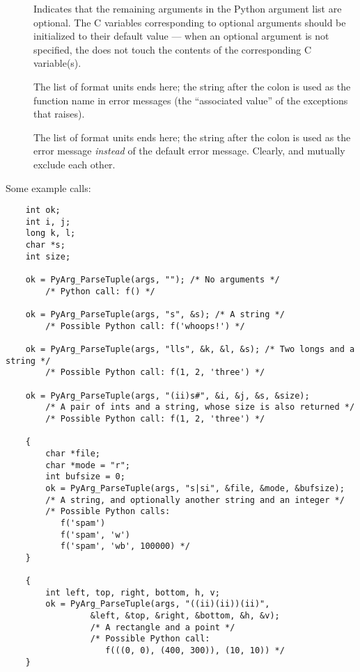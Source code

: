 \begin{description}

\item[\samp{|}]
Indicates that the remaining arguments in the Python argument list are
optional.  The C variables corresponding to optional arguments should
be initialized to their default value --- when an optional argument is
not specified, the  does not touch the contents
of the corresponding C variable(s).

\item[\samp{:}]
The list of format units ends here; the string after the colon is used
as the function name in error messages (the ``associated value'' of
the exceptions that  raises).

\item[\samp{;}]
The list of format units ends here; the string after the colon is used
as the error message \emph{instead} of the default error message.
Clearly, \samp{:} and \samp{;} mutually exclude each other.

\end{description}

Some example calls:

\begin{verbatim}
    int ok;
    int i, j;
    long k, l;
    char *s;
    int size;

    ok = PyArg_ParseTuple(args, ""); /* No arguments */
        /* Python call: f() */
    
    ok = PyArg_ParseTuple(args, "s", &s); /* A string */
        /* Possible Python call: f('whoops!') */

    ok = PyArg_ParseTuple(args, "lls", &k, &l, &s); /* Two longs and a string */
        /* Possible Python call: f(1, 2, 'three') */
    
    ok = PyArg_ParseTuple(args, "(ii)s#", &i, &j, &s, &size);
        /* A pair of ints and a string, whose size is also returned */
        /* Possible Python call: f(1, 2, 'three') */

    {
        char *file;
        char *mode = "r";
        int bufsize = 0;
        ok = PyArg_ParseTuple(args, "s|si", &file, &mode, &bufsize);
        /* A string, and optionally another string and an integer */
        /* Possible Python calls:
           f('spam')
           f('spam', 'w')
           f('spam', 'wb', 100000) */
    }

    {
        int left, top, right, bottom, h, v;
        ok = PyArg_ParseTuple(args, "((ii)(ii))(ii)",
                 &left, &top, &right, &bottom, &h, &v);
                 /* A rectangle and a point */
                 /* Possible Python call:
                    f(((0, 0), (400, 300)), (10, 10)) */
    }
\end{verbatim}


